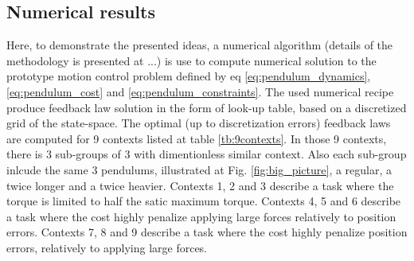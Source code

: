 \subsection{Numerical results}
Here, to demonstrate the presented ideas, a numerical algorithm (details of the methodology is presented at ...) is use to compute numerical solution to the prototype motion control problem defined by eq \eqref{eq:pendulum_dynamics}, \eqref{eq:pendulum_cost} and \eqref{eq:pendulum_constraints}. The used numerical recipe produce feedback law solution in the form of look-up table, based on a discretized grid of the state-space.  The optimal (up to discretization errors) feedback laws are computed for 9 contexts listed at table \ref{tb:9contexts}. In those 9 contexts, there is 3 sub-groups of 3 with dimentionless similar context. Also each sub-group inlcude the same 3 pendulums, illustrated at Fig. \ref{fig:big_picture}, a regular, a twice longer and a twice heavier. Contexts 1, 2 and 3 describe a task where the torque is limited to half the satic maximum torque.  Contexts 4, 5 and 6 describe a task where the cost highly penalize applying large forces relatively to position errors. Contexts 7, 8 and 9 describe a task where the cost highly penalize position errors, relatively to applying large forces. 
